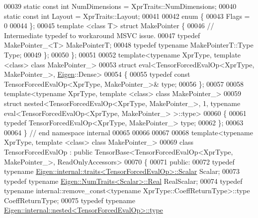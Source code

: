 \begin{DoxyCode}
00039   \textcolor{keyword}{static} \textcolor{keyword}{const} \textcolor{keywordtype}{int} NumDimensions = XprTraits::NumDimensions;
00040   \textcolor{keyword}{static} \textcolor{keyword}{const} \textcolor{keywordtype}{int} Layout = XprTraits::Layout;
00041 
00042   \textcolor{keyword}{enum} \{
00043     Flags = 0
00044   \};
00045   \textcolor{keyword}{template} <\textcolor{keyword}{class} T> \textcolor{keyword}{struct }MakePointer \{
00046     \textcolor{comment}{// Intermediate typedef to workaround MSVC issue.}
00047     \textcolor{keyword}{typedef} MakePointer\_<T> MakePointerT;
00048     \textcolor{keyword}{typedef} \textcolor{keyword}{typename} MakePointerT::Type Type;
00049   \};
00050 \};
00051 
00052 \textcolor{keyword}{template}<\textcolor{keyword}{typename} XprType, \textcolor{keyword}{template} <\textcolor{keyword}{class}> \textcolor{keyword}{class }MakePointer\_>
00053 \textcolor{keyword}{struct }eval<TensorForcedEvalOp<XprType, MakePointer\_>, \hyperlink{namespace_eigen}{Eigen}::Dense>
00054 \{
00055   \textcolor{keyword}{typedef} \textcolor{keyword}{const} TensorForcedEvalOp<XprType, MakePointer\_>& type;
00056 \};
00057 
00058 \textcolor{keyword}{template}<\textcolor{keyword}{typename} XprType, \textcolor{keyword}{template} <\textcolor{keyword}{class}> \textcolor{keyword}{class }MakePointer\_>
00059 \textcolor{keyword}{struct }nested<TensorForcedEvalOp<XprType, MakePointer\_>, 1, typename eval<TensorForcedEvalOp<XprType, 
      MakePointer\_> >::type>
00060 \{
00061   \textcolor{keyword}{typedef} TensorForcedEvalOp<XprType, MakePointer\_> type;
00062 \};
00063 
00064 \}  \textcolor{comment}{// end namespace internal}
00065 
00066 
00067 
00068 \textcolor{keyword}{template}<\textcolor{keyword}{typename} XprType, \textcolor{keyword}{template} <\textcolor{keyword}{class}> \textcolor{keyword}{class }MakePointer\_>
00069 \textcolor{keyword}{class }TensorForcedEvalOp : \textcolor{keyword}{public} TensorBase<TensorForcedEvalOp<XprType, MakePointer\_>, ReadOnlyAccessors>
00070 \{
00071   \textcolor{keyword}{public}:
00072   \textcolor{keyword}{typedef} \textcolor{keyword}{typename} \hyperlink{struct_eigen_1_1internal_1_1traits}{Eigen::internal::traits<TensorForcedEvalOp>::Scalar}
       Scalar;
00073   \textcolor{keyword}{typedef} \textcolor{keyword}{typename} \hyperlink{group___sparse_core___module}{Eigen::NumTraits<Scalar>::Real} RealScalar;
00074   \textcolor{keyword}{typedef} \textcolor{keyword}{typename} internal::remove\_const<typename XprType::CoeffReturnType>::type CoeffReturnType;
00075   \textcolor{keyword}{typedef} \textcolor{keyword}{typename} \hyperlink{class_eigen_1_1internal_1_1_tensor_lazy_evaluator_writable}{Eigen::internal::nested<TensorForcedEvalOp>::type}

\end{DoxyCode}
